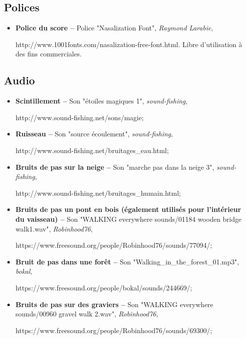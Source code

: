 \subsection*{Polices}

	\begin{itemize}
		\item \textbf{Police du score --} Police "Nasalization Font", \textit{Raymond Larabie}, 
		
		http://www.1001fonts.com/nasalization-free-font.html. Libre d'utilisation à des fins commerciales.		
	\end{itemize}

\subsection*{Audio}
	\begin{itemize}
		\item \textbf{Scintillement --} Son "étoiles magiques 1", \textit{sound-fishing}, 
		
		http://www.sound-fishing.net/sons/magie;
		
		\item \textbf{Ruisseau --} Son "source écoulement", \textit{sound-fishing}, 
		
		http://www.sound-fishing.net/bruitages\_eau.html;
		
		\item \textbf{Bruits de pas sur la neige --} Son "marche pas dans la neige 3", \textit{sound-fishing}, 
		
		http://www.sound-fishing.net/bruitages\_humain.html;
		
		\item \textbf{Bruits de pas un pont en bois (également utilisés pour l'intérieur du vaisseau) --} Son "WALKING everywhere sounds/01184 wooden bridge walk1.wav", \textit{Robinhood76}, 
		
		https://www.freesound.org/people/Robinhood76/sounds/77094/;
		
		\item \textbf{Bruit de pas dans une forêt --} Son "Walking\_in\_the\_forest\_01.mp3", \textit{bokal}, 
		
		https://www.freesound.org/people/bokal/sounds/244669/;
		
		\item \textbf{Bruits de pas sur des graviers --} Son "WALKING everywhere sounds/00960 gravel walk 2.wav", \textit{Robinhood76}, 
		
		https://www.freesound.org/people/Robinhood76/sounds/69300/;
		

\end{itemize}
